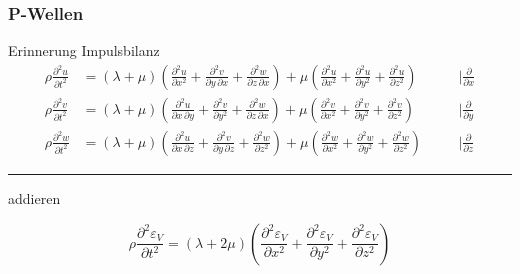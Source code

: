 \begin{frame}
\frametitle{P-Wellen}
Erinnerung Impulsbilanz
\begin{align*}
 \rho \frac{\partial^2 u}{\partial t^2} &= (\lambda + \mu) \left( \frac{\partial^2 u}{\partial x^2} + \frac{\partial^2 v}{\partial y\, \partial x} + \frac{\partial^2 w}{\partial z\,\partial x} \right) + \mu \left( \frac{\partial^2 u}{\partial x^2} + \frac{\partial^2 u}{\partial y^2} + \frac{\partial^2 u}{\partial z^2} \right)
  &\quad& \bigg| \frac{\partial}{\partial x}
 \\
 \rho \frac{\partial^2 v}{\partial t^2} &= (\lambda + \mu) \left( \frac{\partial^2 u}{\partial x\,\partial y} + \frac{\partial^2 v}{\partial y^2} + \frac{\partial^2 w}{\partial z\,\partial x} \right)
 + \mu \left( \frac{\partial^2 v}{\partial x^2} + \frac{\partial^2 v}{\partial y^2} + \frac{\partial^2 v}{\partial z^2} \right)
 &\quad& \bigg| \frac{\partial}{\partial y}
 \\
 \rho \frac{\partial^2 w}{\partial t^2} &= (\lambda + \mu) \left( \frac{\partial^2 u}{\partial x\,\partial z} + \frac{\partial^2 v}{\partial y\, \partial z} + \frac{\partial^2 w}{\partial z^2} \right)
 + \mu \left( \frac{\partial^2 w}{\partial x^2} + \frac{\partial^2 w}{\partial y^2} + \frac{\partial^2 w}{\partial z^2} \right)
 &\quad& \bigg| \frac{\partial}{\partial z}
\end{align*}
\hrule \hfill {\small addieren}

\smallskip
\begin{equation*}
 \rho \frac{\partial^2 \varepsilon_V }{\partial t^2} = 
 (\lambda + 2 \mu) \left( \frac{\partial^2 \varepsilon_V }{\partial x^2} + \frac{\partial^2 \varepsilon_V }{\partial y^2}
 + \frac{\partial^2 \varepsilon_V }{\partial z^2} \right)
\end{equation*}

\end{frame}


